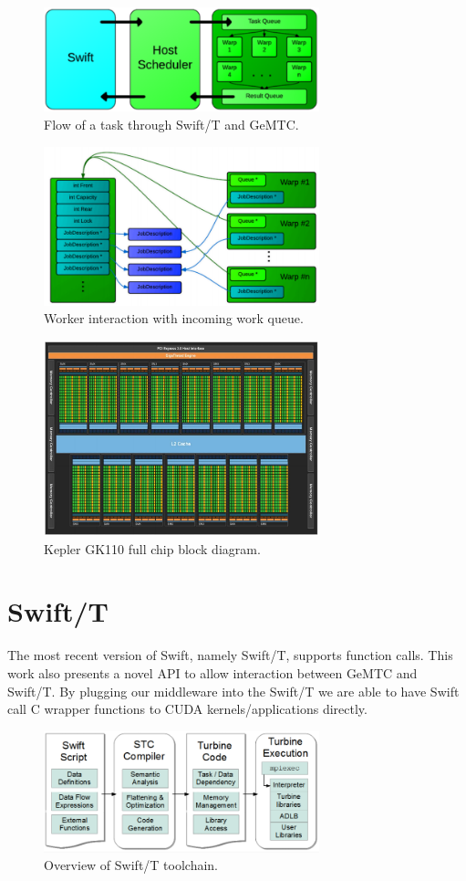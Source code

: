 \documentclass[conference]{IEEEtran}
\begin{document}
\begin{figure}[h]
\centering\includegraphics[width=8cm]{imgs/big_picture.png}
\caption{Flow of a task through Swift/T and GeMTC.}
\label{fig:big_pic}
\end{figure}

\begin{figure}[h]
\centering\includegraphics[width=8cm]{imgs/warps.png}
\caption{Worker interaction with incoming work queue.}
\label{fig:warps}
\end{figure}

\begin{figure}[h]
\centering\includegraphics[width=8cm]{imgs/blockdiagram.png}
\caption{Kepler GK110 full chip block diagram.}
\label{fig:block_diagram}
\end{figure}

\section{Swift/T}
The most recent version of Swift, namely Swift/T, supports function calls.\cite{wozniak13swift} This work also presents a novel API to allow interaction between GeMTC and Swift/T. By plugging our middleware into the Swift/T we are able to have Swift call C wrapper functions to CUDA kernels/applications directly. 
\begin{figure}[h]
\centering\includegraphics[width=8cm]{imgs/swiftt.png}
\caption{Overview of Swift/T toolchain.}
\label{fig:swiftt}
\end{figure}
\end{document}
